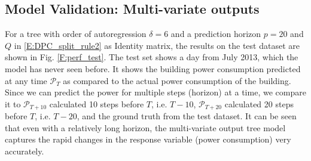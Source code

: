 
\subsection{Model Validation: Multi-variate outputs}
\label{SS:performance_test}
For a tree with order of autoregression $\delta = 6$ and a prediction horizon $p = 20$ and $Q$ in \eqref{E:DPC_split_rule2} as Identity matrix, the results on the test dataset are shown in Fig. \ref{F:perf_test}. The test set shows a day from July 2013, which the model has never seen before. It shows the building power consumption predicted at any time $\mathcal{P}_T$ as compared to the actual power consumption of the building. Since we can predict the power for multiple steps (horizon) at a time, we compare it to $\mathcal{P}_{T+10}$ calculated 10 steps before $T$, i.e. $T-10$,  $\mathcal{P}_{T+20}$ calculated 20 steps before $T$, i.e. $T-20$, and the ground truth from the test dataset. It can be seen that even with a relatively long horizon, the multi-variate output tree model captures the rapid changes in the response variable (power consumption) very accurately.